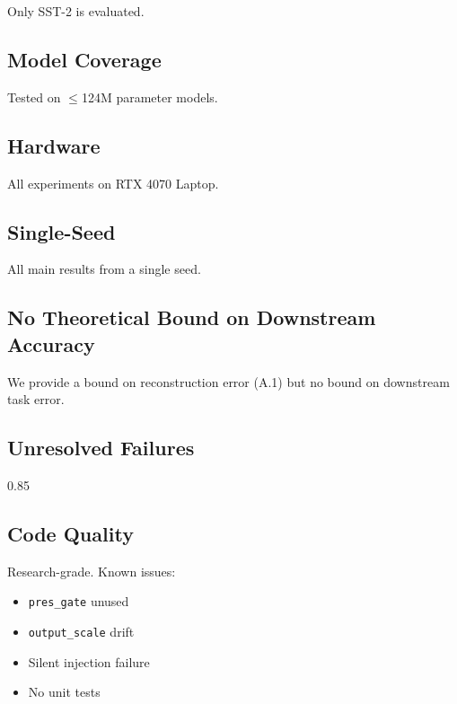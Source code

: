 Only SST-2 is evaluated.

\subsection{Model Coverage}

Tested on $\le$124M parameter models.

\subsection{Hardware}

All experiments on RTX 4070 Laptop.

\subsection{Single-Seed}

All main results from a single seed.

\subsection{No Theoretical Bound on Downstream Accuracy}

We provide a bound on reconstruction error (A.1) but no bound on 
downstream task error.

\subsection{Unresolved Failures}

0.85

\subsection{Code Quality}

Research-grade. Known issues:
\begin{itemize}
\item \texttt{pres\_gate} unused
\item \texttt{output\_scale} drift
\item Silent injection failure
\item No unit tests

\end{itemize}
